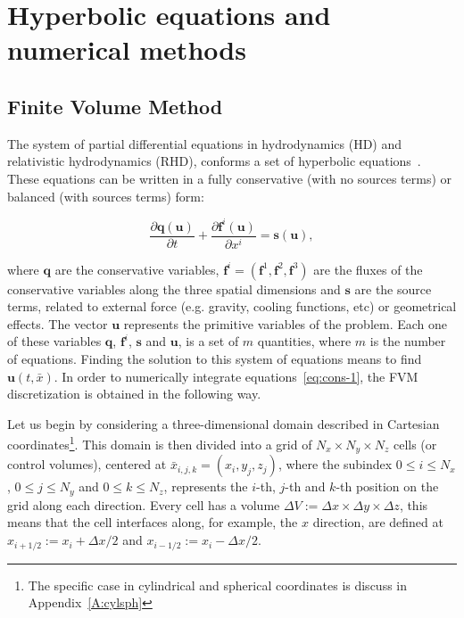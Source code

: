 
\section{Hyperbolic equations and numerical methods}
\label{sec:hyper-equations}


\subsection{Finite Volume Method}
\label{subsec:FVM}

The system of partial differential equations in hydrodynamics (HD) and relativistic hydrodynamics (RHD), conforms a set of hyperbolic equations~\citep[see][]{leveque2002}.  These equations can be written in a fully conservative (with no sources terms) or balanced (with  sources terms) form:

\begin{equation}
    \frac{\partial \mathbf{q} (\mathbf{u})}{\partial t} + \frac{\partial \mathbf{f}^i (\mathbf{u})}
    {\partial x^i} = \mathbf{s}(\mathbf{u}),
\label{eq:cons-1}
\end{equation}

\noindent where $\mathbf{q}$ are the conservative variables, $\mathbf{f}^i = ( \mathbf{f}^1 , \mathbf{f}^2 , \mathbf{f}^3 )$ are the fluxes of the conservative variables along the three spatial dimensions and $\mathbf{s}$ are the source terms, related to external force (e.g. gravity, cooling functions, etc) or geometrical effects. The vector $\mathbf{u}$ represents the primitive variables of the problem. Each one of these variables $\mathbf{q}$, $\mathbf{f}^i$, $\mathbf{s}$ and $\mathbf{u}$, is a set of $m$ quantities, where $m$ is the number of equations. Finding the solution to this system of equations means to find $\mathbf{u} (t,\bar{x})$. In order to numerically integrate equations~\eqref{eq:cons-1}, the FVM discretization is obtained in the following way. 

Let us begin by considering a three-dimensional domain described in Cartesian coordinates\footnote{The specific case in cylindrical and spherical coordinates is discuss in Appendix~\ref{A:cylsph}}. This domain is then divided into a grid of $N_{x} \times N_{y} \times N_{z}$ cells (or control volumes), centered at $\bar{x}_{i,j,k} = (x_i,y_j,z_j)$, where the subindex $0 \leq i \leq N_x$, $0 \leq j \leq N_y$ and $0 \leq k \leq N_z$, represents the $i$-th, $j$-th and $k$-th position on the grid along each direction. Every cell has a volume $\Delta V := \Delta x \times \Delta y \times \Delta z$, this means that the cell interfaces along, for example, the $x$ direction, are defined at $x_{i + 1/2} := x_i + \Delta x / 2$ and $x_{i - 1/2} := x_i - \Delta x / 2$.

